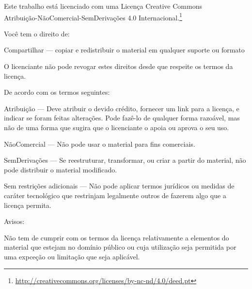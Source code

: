 \clearpage
\thispagestyle{plain}
\vspace*{-3\baselineskip}%

{\fontsize{9}{11}\selectfont\setlength{\parindent}{0pt}%
\raggedright\label{copyright-details}
\setlength{\parskip}{5pt}

{\centering

{\LARGE\ccbyncnd}

\vspace*{\onelineskip}

Este trabalho está licenciado com uma Licença Creative Commons\\
Atribuição-NãoComercial-SemDerivações 4.0 Internacional.\footnote{%
\href{http://creativecommons.org/licenses/by-nc-nd/4.0/deed.pt}{http://creativecommons.org/licenses/by-nc-nd/4.0/deed.pt}}

}

Você tem o direito de:

\begin{packeditemize}
\item Compartilhar — copiar e redistribuir o material em qualquer suporte ou formato
\end{packeditemize}

O licenciante não pode revogar estes direitos desde que respeite os termos da licença.

De acordo com os termos seguintes:

\begin{packeditemize}
\item Atribuição — Deve atribuir o devido crédito, fornecer um link para a licença, e indicar se foram feitas alterações. Pode fazê-lo de qualquer forma razoável, mas não de uma forma que sugira que o licenciante o apoia ou aprova o seu uso.
\item NãoComercial — Não pode usar o material para fins comerciais.
\item SemDerivações — Se reestruturar, transformar, ou criar a partir do material, não pode distribuir o material modificado.
\end{packeditemize}

Sem restrições adicionais — Não pode aplicar termos jurídicos ou medidas de caráter tecnológico que restrinjam legalmente outros de fazerem algo que a licença permita.

Avisos:

Não tem de cumprir com os termos da licença relativamente a elementos do material que estejam no domínio público ou cuja utilização seja permitida por uma expceção ou limitação que seja aplicável.

}
